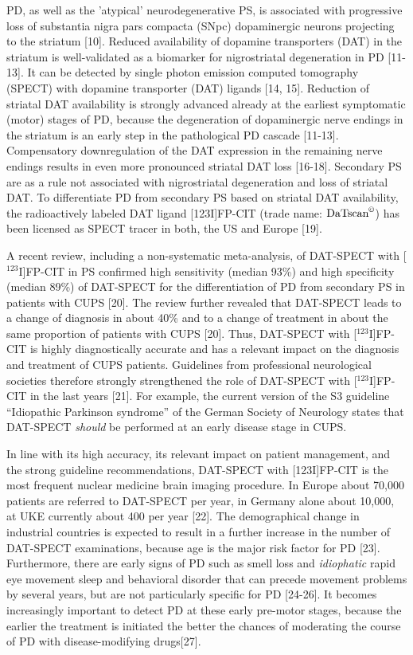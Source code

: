 PD, as well as the 'atypical' neurodegenerative PS, is associated with progressive loss of substantia nigra pars compacta (SNpc) dopaminergic neurons 
projecting to the striatum [10]. 
Reduced availability of dopamine transporters (DAT) in the striatum is well-validated as a biomarker for 
nigrostriatal degeneration in PD [11-13]. 
It can be detected by single photon emission computed tomography (SPECT) with dopamine transporter (DAT) ligands [14, 15]. 
Reduction of striatal DAT availability is strongly advanced already at the earliest symptomatic (motor) stages of PD, 
because the degeneration of dopaminergic nerve endings in the striatum is an early step in the pathological PD cascade [11-13]. 
Compensatory downregulation of the DAT expression in the remaining nerve endings results in even more pronounced striatal DAT loss [16-18]. 
Secondary PS are as a rule not associated with nigrostriatal degeneration and loss of striatal DAT. 
To differentiate PD from secondary PS based on striatal DAT availability, the radioactively labeled DAT ligand [123I]FP-CIT 
(trade name: $\text{DaTscan}^{\copyright}$) has been licensed as SPECT tracer in both, the US and Europe [19].

A recent review, including a non-systematic meta-analysis, of DAT-SPECT with [$^{123}$I]FP-CIT in PS confirmed high sensitivity (median 93\%) 
and high specificity (median 89\%) of DAT-SPECT for the differentiation of PD from secondary PS in patients with CUPS [20]. 
The review further revealed that DAT-SPECT leads to a change of diagnosis in about 40\% and to a change of treatment in about the same proportion of 
patients with CUPS [20]. 
Thus, DAT-SPECT with [$^{123}$I]FP-CIT is highly diagnostically accurate and has a relevant impact on the diagnosis and treatment of CUPS patients. 
Guidelines from professional neurological societies therefore strongly strengthened the role of DAT-SPECT with [$^{123}$I]FP-CIT in the last years [21]. 
For example, the current version of the S3 guideline “Idiopathic Parkinson syndrome” of the German Society of Neurology states that DAT-SPECT 
\textit{should} be performed at an early disease stage in CUPS. 

In line with its high accuracy, its relevant impact on patient management, and the strong guideline recommendations, 
DAT-SPECT with [123I]FP-CIT is the most frequent nuclear medicine brain imaging procedure. 
In Europe about 70,000 patients are referred to DAT-SPECT per year, in Germany alone about 10,000, at UKE currently about 400 per year [22]. 
The demographical change in industrial countries is expected to result in a further increase in the number of DAT-SPECT examinations, 
because age is the major risk factor for PD [23]. 
Furthermore, there are early signs of PD such as smell loss and \textit{idiophatic} rapid eye movement sleep and behavioral disorder 
that can precede movement problems by several years, but are not particularly specific for PD [24-26]. 
It becomes increasingly important to detect PD at these early pre-motor stages, because the earlier the treatment is initiated the better 
the chances of moderating the course of PD with disease-modifying drugs[27].

